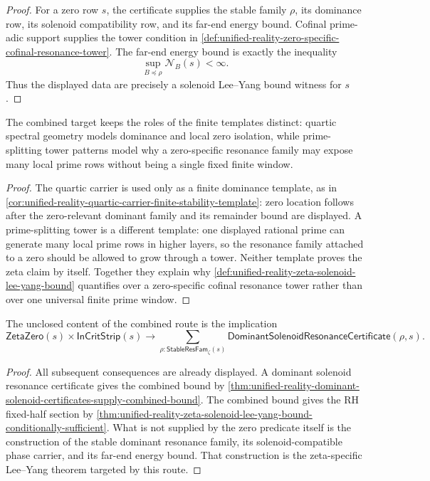 \begin{proof}
For a zero row $s$, the certificate supplies the stable family $\rho$,
its dominance row, its solenoid compatibility row, and its far-end energy
bound.  Cofinal prime-adic support supplies the tower condition in
\autoref{def:unified-reality-zero-specific-cofinal-resonance-tower}.
The far-end energy bound is exactly the inequality
$$
\sup_{B\preceq\rho}\mathcal N_B(s)<\infty.
$$
Thus the displayed data are precisely a solenoid Lee--Yang bound witness
for $s$.
\end{proof}

\begin{corollary}
\label{cor:unified-reality-finite-spectral-tower-splitting-templates}
The combined target keeps the roles of the finite templates distinct:
quartic spectral geometry models dominance and local zero isolation,
while prime-splitting tower patterns model why a zero-specific
resonance family may expose many local prime rows without being a single
fixed finite window.
\end{corollary}

\begin{proof}
The quartic carrier is used only as a finite dominance template, as in
\autoref{cor:unified-reality-quartic-carrier-finite-stability-template}:
zero location follows after the zero-relevant dominant family and its
remainder bound are displayed.  A prime-splitting tower is a different
template: one displayed rational prime can generate many local prime
rows in higher layers, so the resonance family attached to a zero should
be allowed to grow through a tower.  Neither template proves the zeta
claim by itself.  Together they explain why
\autoref{def:unified-reality-zeta-solenoid-lee-yang-bound} quantifies
over a zero-specific cofinal resonance tower rather than over one
universal finite prime window.
\end{proof}

\begin{theorem}
\label{thm:unified-reality-solenoid-bound-remaining-proof-load}
The unclosed content of the combined route is the implication
$$
\mathsf{ZetaZero}(s)
\times
\mathsf{InCritStrip}(s)
\to
\sum_{\rho:\mathsf{StableResFam}_{\zeta}(s)}
\mathsf{DominantSolenoidResonanceCertificate}(\rho,s).
$$
\end{theorem}

\begin{proof}
All subsequent consequences are already displayed.  A dominant solenoid
resonance certificate gives the combined bound by
\autoref{thm:unified-reality-dominant-solenoid-certificates-supply-combined-bound}.
The combined bound gives the RH fixed-half section by
\autoref{thm:unified-reality-zeta-solenoid-lee-yang-bound-conditionally-sufficient}.
What is not supplied by the zero predicate itself is the construction of
the stable dominant resonance family, its solenoid-compatible phase
carrier, and its far-end energy bound.  That construction is the
zeta-specific Lee--Yang theorem targeted by this route.
\end{proof}
